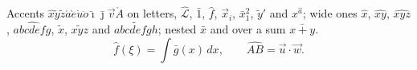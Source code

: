 \documentclass{article}
\begin{document}
Accents $\hat{x}\check{y}\tilde{z}\acute{a}\grave{e}\dot{u}\ddot{o}\breve{\imath}\bar{\jmath}\vec{v}\mathring{A}$ on
letters, $\hat{\mathcal{L}}$, $\bar{1}$, $\hat{f}$, $\vec{x}_{i}$, $\bar{x}^{2}_{1}$, $\tilde{y}'$ and $x^{\hat{a}}$; wide ones
$\widehat{x}$, $\widehat{xy}$, $\widehat{xyz}$, $\widehat{abcdefg}$, $\widetilde{x}$, $\widetilde{xyz}$ and $\widetilde{abcdefgh}$;
nested $\hat{\bar{x}}$ and over a sum $\bar{x+y}$.
\[ \hat{f}(\xi) = \int \bar{g}(x)\, dx, \qquad \widehat{AB} = \vec{u}\cdot\vec{w}. \]
\end{document}
